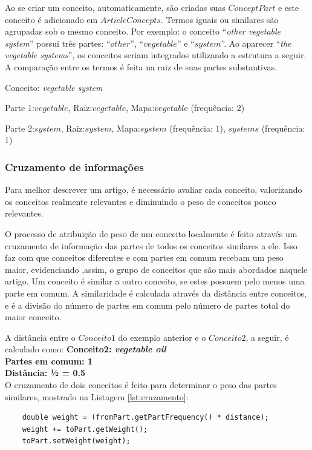 Ao se criar um conceito, automaticamente, são criadas suas $ConceptPart$ e este conceito é adicionado em $ArticleConcepts$. Termos iguais ou similares são agrupadas sob o mesmo conceito. Por exemplo: o conceito “\emph{other vegetable system}” possui três partes: “$other$”, “$vegetable$” e “$system$”.  Ao aparecer “\emph{the vegetable systems}”, os conceitos seriam integrados utilizando a estrutura a seguir. A comparação entre os termos é feita na raiz de suas partes substantivas.

Conceito: \emph{vegetable system}

Parte 1:$vegetable$, Raiz:$vegetable$, Mapa:$vegetabl$e (frequência: 2)

Parte 2:$system$, Raiz:$system$, Mapa:$system$ (frequência: 1), $systems$ (frequência: 1)

\subsubsection{Cruzamento de informações}
Para melhor descrever um artigo, é necessário avaliar cada conceito, valorizando os conceitos realmente relevantes e diminuindo o peso de conceitos pouco relevantes.

O processo de atribuição de peso de um conceito localmente é feito através um cruzamento de informação das partes de todos os conceitos similares a ele. Isso faz com que conceitos diferentes e com partes em comum recebam um peso maior, evidenciando ,assim, o grupo de conceitos que são mais abordados naquele artigo. Um conceito é similar a outro conceito, se estes possuem pelo menos uma parte em comum. A similaridade é calculada através da distância entre conceitos, e é a divisão do número de partes em comum pelo número de partes total do maior conceito.

A distância entre o $Conceito 1$ do exemplo anterior e o $Conceito 2$, a seguir, é calculado como:\newline
\textbf{
Conceito2: \emph{vegetable oil} \\
Partes em comum: 1 \\
Distância: ½ = 0.5}\\

O cruzamento de dois conceitos é feito para determinar o peso das partes similares, mostrado na Listagem \ref{lst:cruzamento}:
\begin{lstlisting}
    double weight = (fromPart.getPartFrequency() * distance);
    weight += toPart.getWeight();
    toPart.setWeight(weight);
\end{lstlisting}

